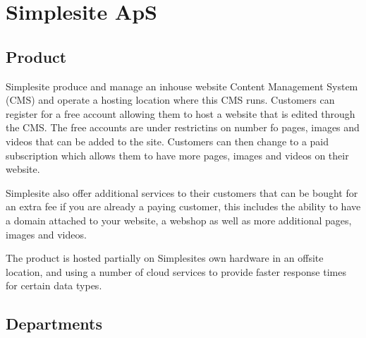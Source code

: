 \section{Simplesite ApS}


\subsection{Product}

Simplesite produce and manage an inhouse website Content Management System (CMS)
and operate a hosting location where this CMS runs. Customers can register for a
free account allowing them to host a website that is edited through the CMS. The
free accounts are under restrictins on number fo pages, images and videos that
can be added to the site. Customers can then change to a paid subscription which
allows them to have more pages, images and videos on their website.

Simplesite also offer additional services to their customers that can be bought
for an extra fee if you are already a paying customer, this includes the ability
to have a domain attached to your website, a webshop as well as more additional
pages, images and videos.

The product is hosted partially on Simplesites own hardware in an offsite
location, and using a number of cloud services to provide faster response times
for certain data types.


\subsection{Departments}

